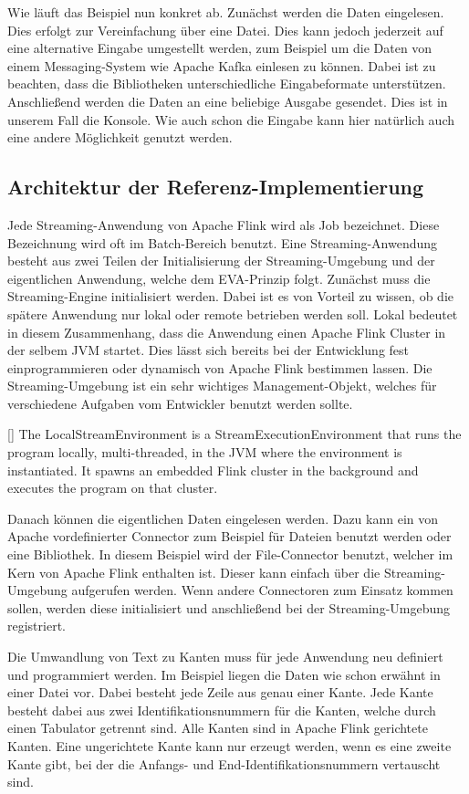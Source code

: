 Wie läuft das Beispiel nun konkret ab. Zunächst werden die Daten eingelesen. Dies
erfolgt zur Vereinfachung über eine Datei. Dies kann jedoch jederzeit auf eine
alternative Eingabe umgestellt werden, zum Beispiel um die Daten von einem
Messaging-System wie Apache Kafka einlesen zu können. Dabei ist zu beachten,
dass die Bibliotheken unterschiedliche Eingabeformate unterstützen. Anschließend
werden die Daten an eine beliebige Ausgabe gesendet. Dies ist in unserem Fall die
Konsole. Wie auch schon die Eingabe kann hier natürlich auch eine andere Möglichkeit
genutzt werden.

\subsection{Architektur der Referenz-Implementierung}
Jede Streaming-Anwendung von Apache Flink wird als Job bezeichnet. Diese
Bezeichnung wird oft im Batch-Bereich benutzt. Eine Streaming-Anwendung besteht
aus zwei Teilen der Initialisierung der Streaming-Umgebung und der eigentlichen
Anwendung, welche dem EVA-Prinzip folgt. Zunächst muss die Streaming-Engine
initialisiert werden. Dabei ist es von Vorteil zu wissen, ob die spätere Anwendung
nur lokal oder remote betrieben werden soll. Lokal bedeutet in diesem Zusammenhang,
dass die Anwendung einen Apache Flink Cluster in der selbem \gls{JVM} startet.
Dies lässt sich bereits bei der Entwicklung fest einprogrammieren oder dynamisch
von Apache Flink bestimmen lassen. Die Streaming-Umgebung ist ein sehr wichtiges
Management-Objekt, welches für verschiedene Aufgaben vom Entwickler benutzt
werden sollte.

[\cite{Foundation2018}]{
The LocalStreamEnvironment is a StreamExecutionEnvironment that runs the program
locally, multi-threaded, in the JVM where the environment is instantiated. It
spawns an embedded Flink cluster in the background and executes the program on
that cluster.}

Danach können die eigentlichen Daten eingelesen werden. Dazu kann ein von Apache
vordefinierter Connector zum Beispiel für Dateien benutzt werden oder eine
Bibliothek. In diesem Beispiel wird der File-Connector benutzt, welcher im Kern
von Apache Flink enthalten ist. Dieser kann einfach über die Streaming-Umgebung
aufgerufen werden. Wenn andere Connectoren zum Einsatz kommen sollen, werden
diese initialisiert und anschließend bei der Streaming-Umgebung registriert.

Die Umwandlung von Text zu Kanten muss für jede Anwendung neu definiert und
programmiert werden. Im Beispiel liegen die Daten wie schon erwähnt in einer
Datei vor. Dabei besteht jede Zeile aus genau einer Kante. Jede Kante besteht
dabei aus zwei Identifikationsnummern für die Kanten, welche durch einen
Tabulator getrennt sind. Alle Kanten sind in Apache Flink gerichtete Kanten.
Eine ungerichtete Kante kann nur erzeugt werden, wenn es eine zweite Kante gibt,
bei der die Anfangs- und End-Identifikationsnummern vertauscht sind.

